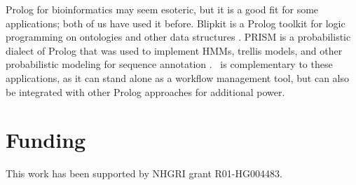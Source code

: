 Prolog for bioinformatics may seem esoteric, but it is a good fit for some applications; both of us have used it before.
Blipkit is a Prolog toolkit for logic programming on ontologies and other data structures \citep{Blipkit2009}.
PRISM is a probabilistic dialect of Prolog that was used to implement HMMs, trellis models, and other probabilistic modeling for sequence annotation \citep{MorkHolmes2012,HaveMork2014}.
\biomake\ is complementary to these applications, as it can stand alone as a workflow management tool, but can also be integrated with other Prolog approaches for additional power.

%

\section*{Funding}

This work has been supported by NHGRI grant R01-HG004483.


%
%
%
%
%
%
%
%



